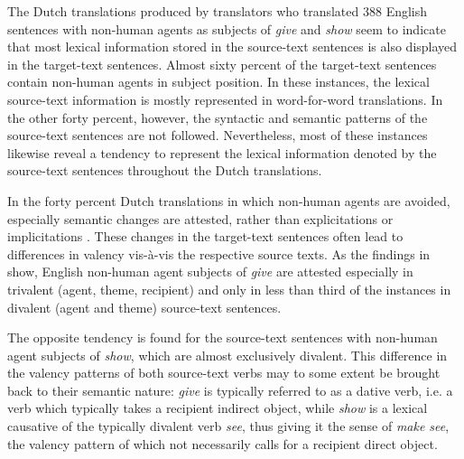 \documentclass[output=paper]{LSP/langsci}
\begin{document}
The Dutch translations produced by translators who translated 388 English sentences with non-human agents as subjects of \textit{give} and \textit{show} seem to indicate that most lexical information stored in the source-text sentences is also displayed in the target-text sentences. Almost sixty percent of the target-text sentences contain non-human agents in subject position. In these instances, the lexical source-text information is mostly represented in word-for-word translations. In the other forty percent, however, the syntactic and semantic patterns of the source-text sentences are not followed. Nevertheless, most of these instances likewise reveal a tendency to represent the lexical information denoted by the source-text sentences throughout the Dutch translations.

In the forty percent Dutch translations in which non-human agents are avoided, especially semantic changes are attested, rather than explicitations or implicitations \citep[see][]{Vandepitte2007}. These changes in the target-text sentences often lead to differences in valency vis-à-vis the respective source texts. As the findings in  show, English non-human agent subjects of \textit{give} are attested especially in trivalent (agent, theme, recipient) and only in less than third of the instances in divalent (agent and theme) source-text sentences. 	

The opposite tendency is found for the source-text sentences with non-human agent subjects of \textit{show}, which are almost exclusively divalent. This difference in the valency patterns of both source-text verbs may to some extent be brought back to their semantic nature: \textit{give} is typically referred to as a dative verb, i.e. a verb which typically takes a recipient indirect object, while \textit{show} is a lexical causative of the typically divalent verb \textit{see}, thus giving it the sense of \textit{make see}, the valency pattern of which not necessarily calls for a recipient direct object.
\end{document}
